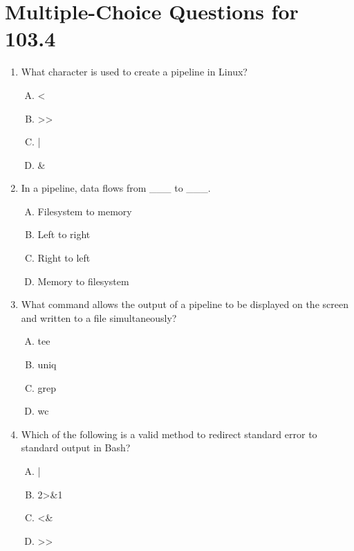 \documentclass[a4paper]{report}
\begin{document}
\newpage
\section*{Multiple-Choice Questions for 103.4}
\begin{enumerate}[1.]

    \item What character is used to create a pipeline in Linux?  
    \begin{enumerate}[A)]
        \item <  
        \item >>  
        \item |  
        \item \&  
    \end{enumerate}

    \item In a pipeline, data flows from \_\_\_ to \_\_\_.  
    \begin{enumerate}[A)]
        \item Filesystem to memory  
        \item Left to right  
        \item Right to left  
        \item Memory to filesystem  
    \end{enumerate}

    \item What command allows the output of a pipeline to be displayed on the screen and written to a file simultaneously?  
    \begin{enumerate}[A)]
        \item tee  
        \item uniq  
        \item grep  
        \item wc  
    \end{enumerate}

    \item Which of the following is a valid method to redirect standard error to standard output in Bash?  
    \begin{enumerate}[A)]
        \item |  
        \item 2>\&1  
        \item <\&  
        \item >>  
    \end{enumerate}


\end{enumerate}
\end{document}

